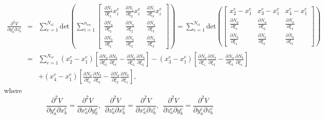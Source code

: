 \documentclass[12pt,aps,pre]{revtex4}
\begin{document}
\begin{eqnarray}
\frac{\partial^2 V}{\partial y_a^e \partial z_b^e} &=& \sum_{e=1}^{N_{el}} \text{det}\left(\sum_{i=1}^{n_{en}} \begin{bmatrix}
\frac{\partial N_i}{\partial \xi_1}x_i^e  & \frac{\partial N_i}{\partial \xi_2}x_i^e & \frac{\partial N_i}{\partial \xi_3}x_i^e \\
%
\frac{\partial N_a}{\partial \xi_1} & \frac{\partial N_a}{\partial \xi_2} & \frac{\partial N_a}{\partial \xi_3}  \\
%
 \frac{\partial N_b}{\partial \xi_1}  & \frac{\partial N_b}{\partial \xi_2} & \frac{\partial N_b}{\partial \xi_3}
\end{bmatrix}\right) 
%
= \sum_{e=1}^{N_{el}} \text{det}\left(\begin{bmatrix}
x_2^e - x_1^e & x_3^e - x_1^e & x_4^e - x_1^e \\
%
\frac{\partial N_a}{\partial \xi_1} & \frac{\partial N_a}{\partial \xi_2} & \frac{\partial N_a}{\partial \xi_3}  \\
%
 \frac{\partial N_b}{\partial \xi_1}  & \frac{\partial N_b}{\partial \xi_2} & \frac{\partial N_b}{\partial \xi_3}
\end{bmatrix}\right) \nonumber\\
&=&\sum_{e=1}^{N_{el}}(x_2^e - x_1^e)\left[\frac{\partial N_a}{\partial \xi_2}\frac{\partial N_b}{\partial \xi_3}-\frac{\partial N_a}{\partial \xi_3}\frac{\partial N_b}{\partial \xi_2}\right] 
%
-(x_3^e - x_1^e)\left[\frac{\partial N_a}{\partial \xi_1}\frac{\partial N_b}{\partial \xi_3}-\frac{\partial N_a}{\partial \xi_3}\frac{\partial N_b}{\partial \xi_1}\right] \nonumber\\
%
&&+(x_4^e - x_1^e)\left[\frac{\partial N_a}{\partial \xi_1}\frac{\partial N_b}{\partial \xi_2}-\frac{\partial N_a}{\partial \xi_2}\frac{\partial N_b}{\partial \xi_1}\right],
\label{eq:dV-offdiag}
\end{eqnarray}
%
where 
%
\begin{equation}
\frac{\partial^2 V}{\partial y_a^e \partial x_b^e} = \frac{\partial^2 V}{\partial x_a^e \partial y_b^e}, \ \
%
\frac{\partial^2 V}{\partial z_a^e \partial x_b^e} = \frac{\partial^2 V}{\partial x_a^e \partial z_b^e}, \ \
%
\frac{\partial^2 V}{\partial z_a^e \partial y_b^e} = \frac{\partial^2 V}{\partial y_a^e \partial z_b^e}
\end{equation}


\end{document}

